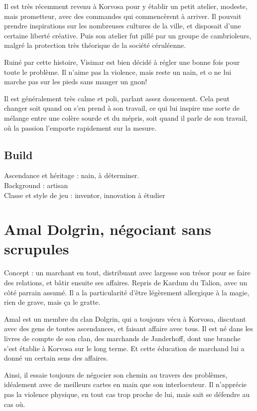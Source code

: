 \documentclass[10pt,a4paper]{book}
\begin{document}
Il est très récemment revenu à Korvosa pour y établir un petit atelier, modeste, mais prometteur, avec des commandes qui commencèrent à arriver. Il pouvait prendre inspirations sur les nombreuses cultures de la ville, et disposait d'une certaine liberté créative. Puis son atelier fut pillé par un groupe de cambrioleurs, malgré la protection très théorique de la société céruléenne. 

Ruiné par cette histoire, Visimar est bien décidé à régler une bonne fois pour toute le problème. Il n'aime pas la violence, mais reste un nain, et o ne lui marche pas sur les pieds sans manger un gnon!

Il est généralement très calme et poli, parlant assez doucement. Cela peut changer soit quand on s'en prend à son travail, ce qui lui inspire une sorte de mélange entre une colère sourde et du mépris, soit quand il parle de son travail, où la passion l'emporte rapidement sur la mesure.
\subsection{Build}
Ascendance et héritage : nain, à déterminer.\\
Background : artisan\\
Classe et style de jeu : inventor, innovation à étudier\\
\section{Amal Dolgrin, négociant sans scrupules}
Concept : un marchant en tout, distribuant avec largesse son trésor pour se faire des relations, et bâtir ensuite ses affaires. Repris de Kardum du Talion, avec un côté parrain assumé. Il a la particularité d'être légèrement allergique à la magie, rien de grave, mais ça le gratte.

Amal est un membre du clan Dolgrin, qui a toujours vécu à Korvosa, discutant avec des gens de toutes ascendances, et faisant affaire avec tous. Il est né dans les livres de compte de son clan, des marchands de Janderhoff, dont une branche s'est établie à Korvosa sur le long terme. Et cette éducation de marchand lui a donné un certain sens des affaires.

Ainsi, il essaie toujours de négocier son chemin au travers des problèmes, idéalement avec de meilleurs cartes en main que son interlocuteur. Il n'apprécie pas la violence physique, en tout cas trop proche de lui, mais sait se défendre au cas où.
\end{document}
